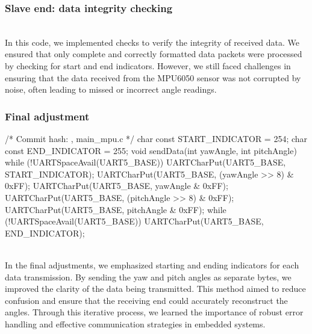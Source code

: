 \documentclass[12pt, a4paper]{article}
\begin{document}
\subsubsection{Slave end: data integrity checking}\text{}
\text{}\\
In this code, we implemented checks to verify the integrity of received data. 
We ensured that only complete and correctly formatted data packets were processed by checking for start and end indicators. 
However, we still faced challenges in ensuring that the data received from the MPU6050 sensor was not corrupted by noise, 
often leading to missed or incorrect angle readings.

\subsubsection{Final adjustment}\text{}
\begin{code}
/* Commit hash: , main_mpu.c */
char const START_INDICATOR = 254;
char const END_INDICATOR = 255;
void sendData(int yawAngle, int pitchAngle) {
    while (!UARTSpaceAvail(UART5_BASE)) {}
    UARTCharPut(UART5_BASE, START_INDICATOR);
    UARTCharPut(UART5_BASE, (yawAngle >> 8) & 0xFF);
    UARTCharPut(UART5_BASE, yawAngle & 0xFF);
    UARTCharPut(UART5_BASE, (pitchAngle >> 8) & 0xFF);
    UARTCharPut(UART5_BASE, pitchAngle & 0xFF);
    while (!UARTSpaceAvail(UART5_BASE)) {
        UARTCharPut(UART5_BASE, END_INDICATOR);
    }
}
\end{code}\text{}\\
In the final adjustments, we emphasized starting and ending indicators for each data transmission. 
By sending the yaw and pitch angles as separate bytes, we improved the clarity of the data being transmitted. 
This method aimed to reduce confusion and ensure that the receiving end could accurately reconstruct the angles. 
Through this iterative process, we learned the importance of robust error handling and effective communication strategies in embedded systems.
\end{document}
